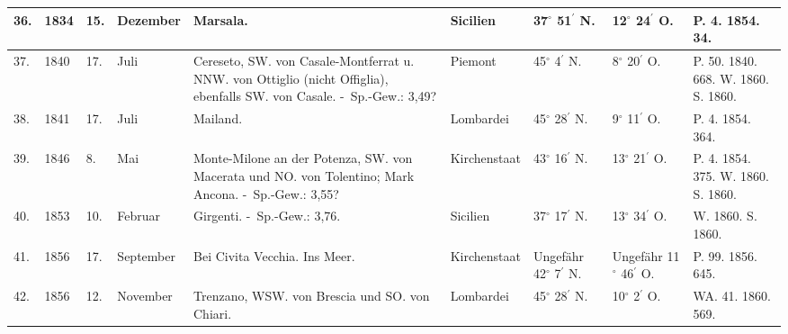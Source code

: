 \documentclass[a4paper, 8pt, oneside, polutonikogreek, german]{article}
\begin{document}
\begin{table}[!ht]
\begin{tabular}{|l|l|l|l|l|l|l|l|l|}
        36. & 1834 & 15. & Dezember & Marsala. & Sicilien & 37$^\circ$ 51$^\prime$ N. & 12$^\circ$ 24$^\prime$ O. & P. 4. 1854. 34. \\ \hline
        37. & 1840 & 17. & Juli & Cereseto, SW. von Casale-Montferrat u. NNW. von Ottiglio (nicht Offiglia), ebenfalls SW. von Casale. - Sp.-Gew.: 3,49? & Piemont & 45$^\circ$ 4$^\prime$ N. & 8$^\circ$ 20$^\prime$ O. & P. 50. 1840. 668. W. 1860. S. 1860. \\ \hline
        38. & 1841 & 17. & Juli & Mailand. & Lombardei & 45$^\circ$ 28$^\prime$ N. & 9$^\circ$ 11$^\prime$ O. & P. 4. 1854. 364. \\ \hline
        39. & 1846 & 8. & Mai & Monte-Milone an der Potenza, SW. von Macerata und NO. von Tolentino; Mark Ancona. - Sp.-Gew.: 3,55? & Kirchenstaat & 43$^\circ$ 16$^\prime$ N. & 13$^\circ$ 21$^\prime$ O. & P. 4. 1854. 375. W. 1860. S. 1860. \\ \hline
        40. & 1853 & 10. & Februar & Girgenti. - Sp.-Gew.: 3,76. & Sicilien & 37$^\circ$ 17$^\prime$ N. & 13$^\circ$ 34$^\prime$ O. & W. 1860. S. 1860. \\ \hline
        41. & 1856 & 17. & September & Bei Civita Vecchia. Ins Meer. & Kirchenstaat & Ungefähr 42$^\circ$ 7$^\prime$ N. & Ungefähr 11$^\circ$ 46$^\prime$ O. & P. 99. 1856. 645. \\ \hline
        42. & 1856 & 12. & November & Trenzano, WSW. von Brescia und SO. von Chiari. & Lombardei & 45$^\circ$ 28$^\prime$ N. & 10$^\circ$ 2$^\prime$ O. & WA. 41. 1860. 569. \\ \hline
    \end{tabular}
\end{table}
\clearpage
\end{document}
